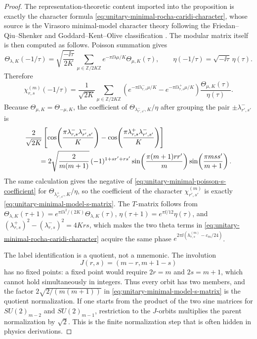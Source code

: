 \begin{proof}
The representation-theoretic content imported into the proposition is exactly
the character formula \eqref{eq:unitary-minimal-rocha-caridi-character}, whose
source is the Virasoro minimal-model character theory following the
Friedan--Qiu--Shenker and Goddard--Kent--Olive classification
\cite{FriedanQiuShenker1984,GoddardKentOlive1986}.  The modular matrix itself
is then computed as follows.  Poisson summation gives
\begin{equation}
  \Theta_{\lambda,K}(-1/\tau)
  =
  \sqrt{\frac{-\ii\tau}{2K}}\,
  \sum_{\mu\in\mathbb Z/2K\mathbb Z}
  e^{-\pi\ii\lambda\mu/K}\Theta_{\mu,K}(\tau),
  \qquad
  \eta(-1/\tau)=\sqrt{-\ii\tau}\,\eta(\tau).
  \label{eq:unitary-minimal-poisson-theta}
\end{equation}
Therefore
\[
  \chi_{r,s}^{(m)}(-1/\tau)
  =
  \frac{1}{\sqrt{2K}}
  \sum_{\mu\in\mathbb Z/2K\mathbb Z}
  \left(
  e^{-\pi\ii\lambda^-_{r,s}\mu/K}
  -
  e^{-\pi\ii\lambda^+_{r,s}\mu/K}
  \right)
  \frac{\Theta_{\mu,K}(\tau)}{\eta(\tau)} .
\]
Because \(\Theta_{\mu,K}=\Theta_{-\mu,K}\), the coefficient of
\(\Theta_{\lambda^-_{r',s'},K}/\eta\) after grouping the pair
\(\pm\lambda^-_{r',s'}\) is
\begin{align}
  &\frac{2}{\sqrt{2K}}
  \left[
  \cos\!\left(
  \frac{\pi\lambda^-_{r,s}\lambda^-_{r',s'}}{K}
  \right)
  -
  \cos\!\left(
  \frac{\pi\lambda^+_{r,s}\lambda^-_{r',s'}}{K}
  \right)
  \right]                                      \notag\\
  &\qquad =
  2\sqrt{\frac{2}{m(m+1)}}\,
  (-1)^{1+sr'+rs'}
  \sin\!\left(\frac{\pi(m+1)rr'}{m}\right)
  \sin\!\left(\frac{\pi mss'}{m+1}\right).
  \label{eq:unitary-minimal-poisson-s-coefficient}
\end{align}
The same calculation gives the negative of
\eqref{eq:unitary-minimal-poisson-s-coefficient} for
\(\Theta_{\lambda^+_{r',s'},K}/\eta\), so the coefficient of the character
\(\chi_{r',s'}^{(m)}\) is exactly
\eqref{eq:unitary-minimal-model-s-matrix}.  The \(T\)-matrix follows from
\(\Theta_{\lambda,K}(\tau+1)=e^{\pi\ii\lambda^2/(2K)}\Theta_{\lambda,K}(\tau)\),
\(\eta(\tau+1)=e^{\pi\ii/12}\eta(\tau)\), and
\((\lambda^+_{r,s})^2-(\lambda^-_{r,s})^2=4Krs\), which makes the two theta
terms in \eqref{eq:unitary-minimal-rocha-caridi-character} acquire the same
phase \(e^{2\pi\ii(h_{r,s}^{(m)}-c_m/24)}\).

The label identification is a quotient, not a mnemonic.  The involution
\[
  J(r,s)=(m-r,m+1-s)
\]
has no fixed points: a fixed point would require \(2r=m\) and \(2s=m+1\),
which cannot hold simultaneously in integers.  Thus every orbit has two
members, and the factor \(2\sqrt{2/(m(m+1))}\) in
\eqref{eq:unitary-minimal-model-s-matrix} is the quotient normalization.  If
one starts from the product of the two sine matrices for \(SU(2)_{m-2}\) and
\(SU(2)_{m-1}\), restriction to the \(J\)-orbits multiplies the parent
normalization by \(\sqrt2\).  This is the finite normalization step that is
often hidden in physics derivations.
\end{proof}

